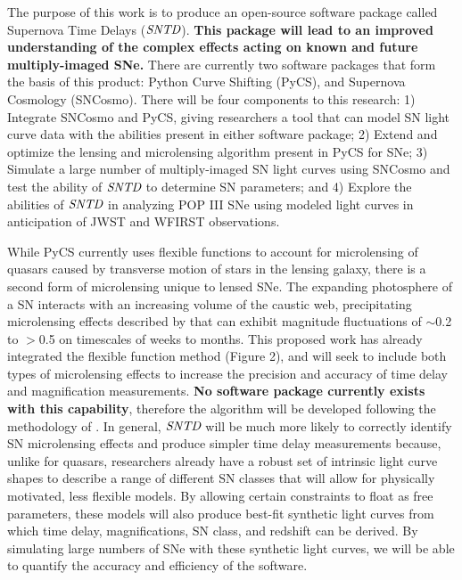 The purpose of this work is to produce an open-source software
package called Supernova Time Delays ($\textit{SNTD}$). \textbf{This package will
lead to an improved understanding of the complex effects acting on 
known and future multiply-imaged SNe.}
There are currently two software packages that form the basis 
of this product: Python Curve Shifting (PyCS), and Supernova Cosmology 
(SNCosmo). There will be four components to this research: 1) Integrate 
SNCosmo and PyCS, giving researchers a tool
that can model SN light curve data with the abilities present in either
software package; 2) Extend and optimize the lensing and microlensing
algorithm present in PyCS for SNe; 3) Simulate a large number of multiply-imaged SN
light curves using SNCosmo and test the ability of $\textit{SNTD}$ to
determine SN parameters; and 4) Explore the abilities of
$\textit{SNTD}$ in analyzing POP III SNe using modeled light curves in
anticipation of JWST and WFIRST observations.


While PyCS currently uses flexible functions to account for
microlensing of quasars caused by transverse motion of stars in the
lensing galaxy, there is a second form of microlensing unique to
lensed SNe. The expanding photosphere of a SN interacts with an 
increasing volume of the caustic web, precipitating microlensing effects 
described by \cite{Dobler:2006} that can exhibit magnitude 
fluctuations of $\sim$0.2 to $>$0.5 on timescales of weeks to months. 
This proposed work has already integrated the flexible function method 
(Figure 2), and will seek to include both types of microlensing effects to 
increase the precision and accuracy of time delay and magnification measurements. 
\textbf{No software package currently
exists with this capability}, therefore the algorithm will be developed
following the methodology of \cite{Dobler:2006}. In general,
$\textit{SNTD}$ will be much more likely to correctly identify SN
microlensing effects and produce simpler time delay measurements
because, unlike for quasars, researchers already have a robust set of
intrinsic light curve shapes to describe a range of different SN
classes that will allow for physically motivated, less flexible
models. By allowing certain constraints to float as free parameters,
these models will also produce best-fit synthetic light curves from
which time delay, magnifications, SN class, and redshift can be
derived. By simulating large numbers of SNe with these synthetic light
curves, we will be able to quantify the accuracy and efficiency of the
software.


